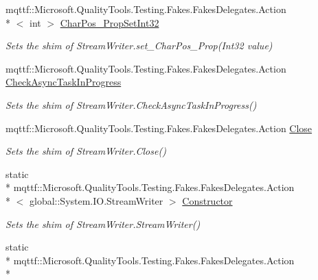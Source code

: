 \begin{DoxyCompactItemize}
mqttf\-::\-Microsoft.\-Quality\-Tools.\-Testing.\-Fakes.\-Fakes\-Delegates.\-Action\\*
$<$ int $>$ \hyperlink{class_system_1_1_i_o_1_1_fakes_1_1_shim_stream_writer_a9024a9c68a380eb570352e7f9063e7cc}{Char\-Pos\-\_\-\-Prop\-Set\-Int32}
\begin{DoxyCompactList}\small\item\em Sets the shim of Stream\-Writer.\-set\-\_\-\-Char\-Pos\-\_\-\-Prop(\-Int32 value)\end{DoxyCompactList}\item 
mqttf\-::\-Microsoft.\-Quality\-Tools.\-Testing.\-Fakes.\-Fakes\-Delegates.\-Action \hyperlink{class_system_1_1_i_o_1_1_fakes_1_1_shim_stream_writer_a68751d2886be9a3c8a45fd4a0ea4ec86}{Check\-Async\-Task\-In\-Progress}
\begin{DoxyCompactList}\small\item\em Sets the shim of Stream\-Writer.\-Check\-Async\-Task\-In\-Progress()\end{DoxyCompactList}\item 
mqttf\-::\-Microsoft.\-Quality\-Tools.\-Testing.\-Fakes.\-Fakes\-Delegates.\-Action \hyperlink{class_system_1_1_i_o_1_1_fakes_1_1_shim_stream_writer_a6d57e65d90d172281414209c6854ba1b}{Close}
\begin{DoxyCompactList}\small\item\em Sets the shim of Stream\-Writer.\-Close()\end{DoxyCompactList}\item 
static \\*
mqttf\-::\-Microsoft.\-Quality\-Tools.\-Testing.\-Fakes.\-Fakes\-Delegates.\-Action\\*
$<$ global\-::\-System.\-I\-O.\-Stream\-Writer $>$ \hyperlink{class_system_1_1_i_o_1_1_fakes_1_1_shim_stream_writer_a74a23566523a9ac51d2fbad5f4b821cf}{Constructor}
\begin{DoxyCompactList}\small\item\em Sets the shim of Stream\-Writer.\-Stream\-Writer()\end{DoxyCompactList}\item 
static \\*
mqttf\-::\-Microsoft.\-Quality\-Tools.\-Testing.\-Fakes.\-Fakes\-Delegates.\-Action\\*

\end{DoxyCompactItemize}
